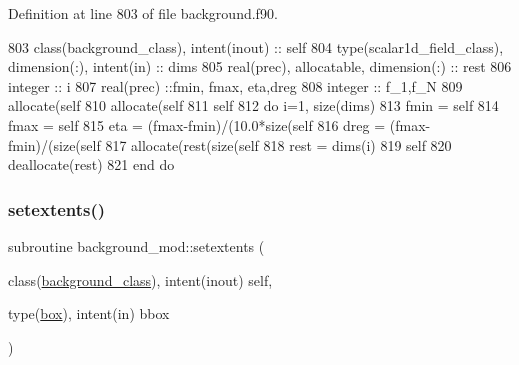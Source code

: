 Definition at line 803 of file background.\+f90.


\begin{DoxyCode}
803     \textcolor{keywordtype}{class}(background\_class), \textcolor{keywordtype}{intent(inout)} :: self
804     \textcolor{keywordtype}{type}(scalar1d\_field\_class), \textcolor{keywordtype}{dimension(:)}, \textcolor{keywordtype}{intent(in)} :: dims
805     \textcolor{keywordtype}{real(prec)}, \textcolor{keywordtype}{allocatable}, \textcolor{keywordtype}{dimension(:)} :: rest
806     \textcolor{keywordtype}{integer} :: i
807     \textcolor{keywordtype}{real(prec)} ::fmin, fmax, eta,dreg
808     \textcolor{keywordtype}{integer} :: f\_1,f\_N
809     \textcolor{keyword}{allocate}(self%
810     \textcolor{keyword}{allocate}(self%
811     self%
812     \textcolor{keywordflow}{do} i=1, \textcolor{keyword}{size}(dims)
813         fmin = self%
814         fmax = self%
815         eta = (fmax-fmin)/(10.0*\textcolor{keyword}{size}(self%
816         dreg = (fmax-fmin)/(\textcolor{keyword}{size}(self%
817         \textcolor{keyword}{allocate}(rest(\textcolor{keyword}{size}(self%
818         rest = dims(i)%
819         self%
820         \textcolor{keyword}{deallocate}(rest)
821 \textcolor{keywordflow}{    end do}
\end{DoxyCode}
\mbox{\label{namespacebackground__mod_ae8871564866fdd657a25f6a5a2256c33}} 
\subsubsection{\texorpdfstring{setextents()}{setextents()}}
{\footnotesize\ttfamily subroutine background\+\_\+mod\+::setextents (\begin{DoxyParamCaption}\item[{class(\mbox{\hyperlink{structbackground__mod_1_1background__class}{background\+\_\+class}}), intent(inout)}]{self,  }\item[{type(\mbox{\hyperlink{structgeometry__mod_1_1box}{box}}), intent(in)}]{bbox }\end{DoxyParamCaption})\hspace{0.3cm}{\ttfamily [private]}}



